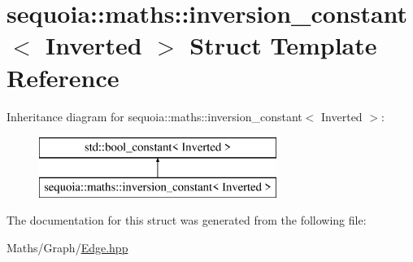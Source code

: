 \hypertarget{structsequoia_1_1maths_1_1inversion__constant}{}\section{sequoia\+::maths\+::inversion\+\_\+constant$<$ Inverted $>$ Struct Template Reference}
\label{structsequoia_1_1maths_1_1inversion__constant}
Inheritance diagram for sequoia\+::maths\+::inversion\+\_\+constant$<$ Inverted $>$\+:\begin{figure}[H]
\begin{center}
\leavevmode
\includegraphics[height=2.000000cm]{structsequoia_1_1maths_1_1inversion__constant}
\end{center}
\end{figure}


The documentation for this struct was generated from the following file\+:\begin{DoxyCompactItemize}
\item 
Maths/\+Graph/\mbox{\hyperlink{_edge_8hpp}{Edge.\+hpp}}\end{DoxyCompactItemize}
